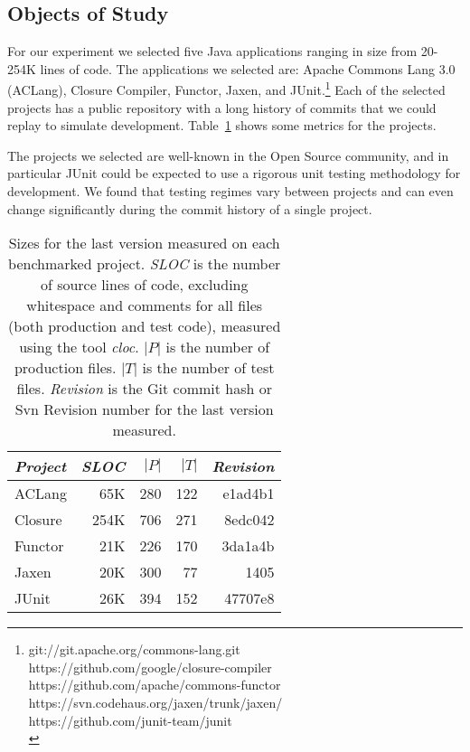{\subsection{Objects of Study}
\label{ObjectsOfStudy}

For our experiment we selected five Java applications ranging in size from 20-254K lines of code.
The applications we selected are:
Apache Commons Lang 3.0 (ACLang),
Closure Compiler,
Functor,
Jaxen,
and JUnit.\footnote{
git://git.apache.org/commons-lang.git \\
https://github.com/google/closure-compiler \\
https://github.com/apache/commons-functor \\
https://svn.codehaus.org/jaxen/trunk/jaxen/ \\
https://github.com/junit-team/junit \\
}
Each of the selected projects
has a public repository with a long history of commits that we could replay to simulate
development.  Table~\ref{tbl:locs} shows some metrics for
the projects.

The projects we selected are well-known in the Open Source community, and in particular JUnit could
be expected to use a rigorous unit testing methodology for development.  We found that testing
regimes vary between projects and can even change significantly during the commit history of a
single project.

\begin{table}[h]
  \centering
\begin{tabular}{l|r|r|r|r}
  \emph{Project} & \emph{SLOC} & $|P|$ & $|T|$ & \emph{Revision} \\
  \hline
  ACLang & 65K & 280 & 122 & e1ad4b1 \\
  Closure & 254K & 706 & 271 & 8edc042 \\
  Functor & 21K & 226 & 170 & 3da1a4b \\
  Jaxen & 20K & 300 & 77 & 1405 \\
  JUnit & 26K & 394 & 152 & 47707e8 \\
  \hline
\end{tabular}
\caption{Sizes for the last version measured on each benchmarked project.
\emph{SLOC} is the number of source lines of code,
excluding whitespace and comments for all files (both production and test code),
measured using the tool \emph{cloc}.
$|P|$ is the number of production files.
$|T|$ is the number of test files.
\emph{Revision} is the Git commit hash or Svn Revision number for the last version measured.}
\label{tbl:locs}
\end{table}

}
